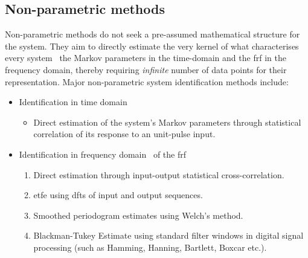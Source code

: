 \subsection{Non-parametric methods}
Non-parametric methods do not seek  a pre-assumed mathematical structure for the
system. They  aim to  directly estimate  the very  kernel of  what characterises
every system \viz~the Markov parameters in the time-domain  and the \gls{frf}
in the frequency domain, thereby requiring \emph{infinite} number of data points
for  their representation.  Major non-parametric  system identification  methods
include:
\begin{itemize}[topsep=0pt]
    \item Identification in time domain
        \begin{itemize}

            \item Direct  estimation of the system's  Markov parameters through
                statistical correlation of its response to an unit-pulse input.

        \end{itemize}
    \item Identification in frequency domain \ie~of the \gls{frf}
        \begin{enumerate}

            \item   Direct   estimation    through   input-output   statistical
                cross-correlation.

            \item  \gls{etfe} using \glspl{dft} of input and output sequences.

            \item  Smoothed periodogram estimates using Welch's method.

            \item  Blackman-Tukey  Estimate   using  standard  filter
                windows  in digital  signal processing  (such as  Hamming, Hanning,
                Bartlett, Boxcar etc.).

        \end{enumerate}
\end{itemize}

